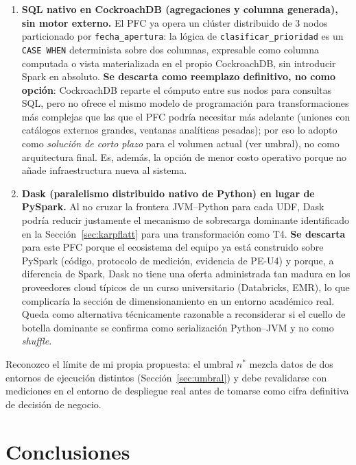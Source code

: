 \documentclass[11pt,a4paper]{article}
\begin{document}
\begin{enumerate}
\item \textbf{SQL nativo en CockroachDB (agregaciones y columna generada), sin motor externo.}
El PFC ya opera un clúster distribuido de 3 nodos particionado por \texttt{fecha\_apertura}: la
lógica de \texttt{clasificar\_prioridad} es un \texttt{CASE WHEN} determinista sobre dos
columnas, expresable como columna computada o vista materializada en el propio CockroachDB, sin
introducir Spark en absoluto. \textbf{Se descarta como reemplazo definitivo, no como opción}:
CockroachDB reparte el cómputo entre sus nodos para consultas SQL, pero no ofrece el mismo
modelo de programación para transformaciones más complejas que las que el PFC podría necesitar
más adelante (uniones con catálogos externos grandes, ventanas analíticas pesadas); por eso lo
adopto como \emph{solución de corto plazo} para el volumen actual (ver umbral), no como
arquitectura final. Es, además, la opción de menor costo operativo porque no añade infraestructura
nueva al sistema.
\item \textbf{Dask (paralelismo distribuido nativo de Python) en lugar de PySpark.} Al no cruzar
la frontera JVM--Python para cada UDF, Dask podría reducir justamente el mecanismo de sobrecarga
dominante identificado en la Sección~\ref{sec:karpflatt} para una transformación como T4. \textbf{Se
descarta} para este PFC porque el ecosistema del equipo ya está construido sobre PySpark (código,
protocolo de medición, evidencia de PE-U4) y porque, a diferencia de Spark, Dask no tiene una
oferta administrada tan madura en los proveedores cloud típicos de un curso universitario
(Databricks, EMR), lo que complicaría la sección de dimensionamiento en un entorno académico
real. Queda como alternativa técnicamente razonable a reconsiderar si el cuello de botella
dominante se confirma como serialización Python--JVM y no como \emph{shuffle}.
\end{enumerate}

Reconozco el límite de mi propia propuesta: el umbral \(n^{*}\) mezcla datos de dos entornos de
ejecución distintos (Sección~\ref{sec:umbral}) y debe revalidarse con mediciones en el entorno
de despliegue real antes de tomarse como cifra definitiva de decisión de negocio.

\section{Conclusiones}
\end{document}
